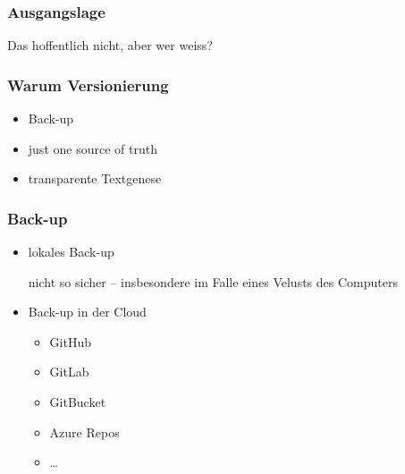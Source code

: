 \documentclass[table]{beamer}
\begin{document}
    \begin{frame}
        \frametitle{Ausgangslage}
        Das hoffentlich nicht, aber wer weiss?

        \vspace*{5mm}

       
    \end{frame}

    \begin{frame}
        \frametitle{Warum Versionierung}

        \begin{itemize}
            \item Back-up
            \item just one source of truth
            \item transparente Textgenese
        \end{itemize}
    \end{frame}

    \begin{frame}
        \frametitle{Back-up}

        \begin{itemize}
            \item lokales Back-up
                
            nicht so sicher -- insbesondere im Falle eines Velusts des
            Computers
            
           \item Back-up in der Cloud
           \begin{itemize}
            \item GitHub
            \item GitLab
            \item GitBucket
            \item Azure Repos
            \item \dots
           \end{itemize}
        \end{itemize}   
        
    
    \end{frame}
\end{document}
